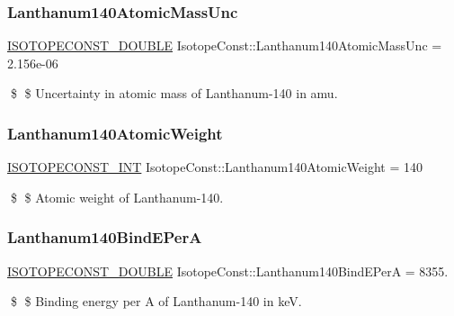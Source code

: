 \subsubsection{\texorpdfstring{Lanthanum140\+Atomic\+Mass\+Unc}{Lanthanum140AtomicMassUnc}}
{\footnotesize\ttfamily \mbox{\hyperlink{group___isotope_const-_macros_ga8f45a7272ce02c0b4c65c44636ed719a}{I\+S\+O\+T\+O\+P\+E\+C\+O\+N\+S\+T\+\_\+\+D\+O\+U\+B\+LE}} Isotope\+Const\+::\+Lanthanum140\+Atomic\+Mass\+Unc = 2.\+156e-\/06}

\$ \$ Uncertainty in atomic mass of Lanthanum-\/140 in amu. \mbox{\label{group___isotope_const-_lanthanum-_la140_gad8c1ad88346ee94d51ac9620a9d1da1b}} 
\subsubsection{\texorpdfstring{Lanthanum140\+Atomic\+Weight}{Lanthanum140AtomicWeight}}
{\footnotesize\ttfamily \mbox{\hyperlink{group___isotope_const-_macros_ga5f18360b3e99483a35c32d789e62621c}{I\+S\+O\+T\+O\+P\+E\+C\+O\+N\+S\+T\+\_\+\+I\+NT}} Isotope\+Const\+::\+Lanthanum140\+Atomic\+Weight = 140}

\$ \$ Atomic weight of Lanthanum-\/140. \mbox{\label{group___isotope_const-_lanthanum-_la140_ga4c8c00d704b5afc7bcbfe96278c2b3ef}} 
\subsubsection{\texorpdfstring{Lanthanum140\+Bind\+E\+PerA}{Lanthanum140BindEPerA}}
{\footnotesize\ttfamily \mbox{\hyperlink{group___isotope_const-_macros_ga8f45a7272ce02c0b4c65c44636ed719a}{I\+S\+O\+T\+O\+P\+E\+C\+O\+N\+S\+T\+\_\+\+D\+O\+U\+B\+LE}} Isotope\+Const\+::\+Lanthanum140\+Bind\+E\+PerA = 8355.}

\$ \$ Binding energy per A of Lanthanum-\/140 in keV. \mbox{\label{group___isotope_const-_lanthanum-_la140_ga3a0ec4a0ef6d4f7254de6f81650871c2}} 
